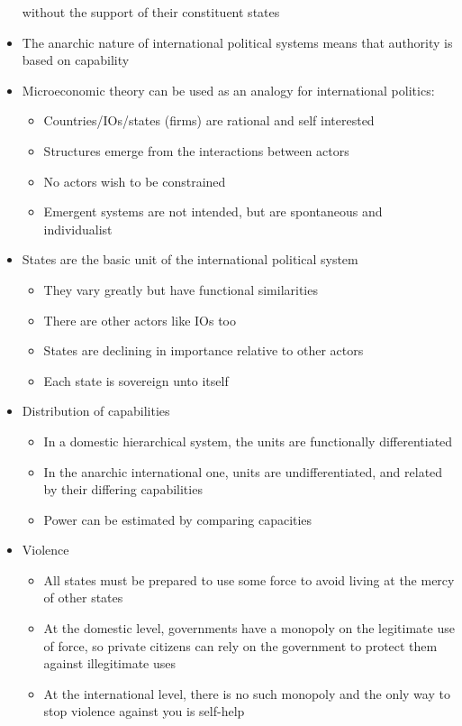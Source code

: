 \documentclass[11pt]{article}
\begin{document}
\begin{itemize}
without the support of their constituent states
\item The anarchic nature of international political systems means that authority is
based on capability
\item Microeconomic theory can be used as an analogy for international politics:
\begin{itemize}
\item Countries/IOs/states (firms) are rational and self interested
\item Structures emerge from the interactions between actors
\item No actors wish to be constrained
\item Emergent systems are not intended, but are spontaneous and individualist
\end{itemize}
\item States are the basic unit of the international political system
\begin{itemize}
\item They vary greatly but have functional similarities
\item There are other actors like IOs too
\item States are declining in importance relative to other actors
\item Each state is sovereign unto itself
\end{itemize}
\item Distribution of capabilities
\begin{itemize}
\item In a domestic hierarchical system, the units are functionally differentiated
\item In the anarchic international one, units are undifferentiated, and related
by their differing capabilities
\item Power can be estimated by comparing capacities
\end{itemize}
\item Violence
\begin{itemize}
\item All states must be prepared to use some force to avoid living at the mercy
of other states
\item At the domestic level, governments have a monopoly on the legitimate use of
force, so private citizens can rely on the government to protect them
against illegitimate uses
\item At the international level, there is no such monopoly and the only way to
stop violence against you is self-help
\end{itemize}

\end{itemize}
\end{document}
